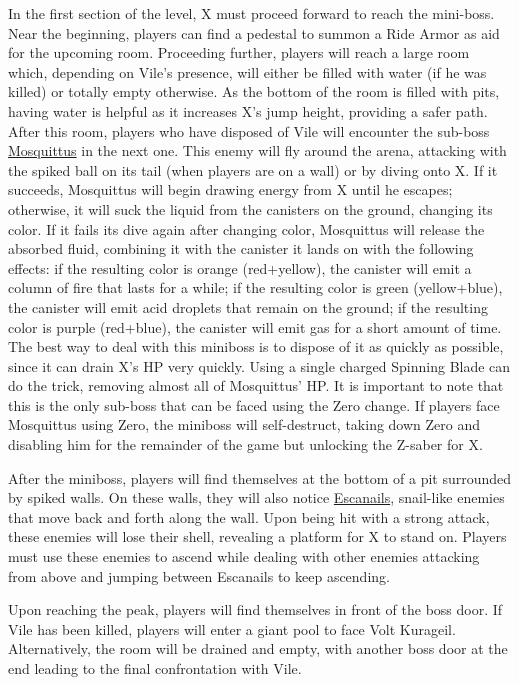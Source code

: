 In the first section of the level, X must proceed forward to reach the mini-boss. Near the beginning, players can find a pedestal to summon a Ride Armor as aid for the upcoming room. Proceeding further, players will reach a large room which, depending on Vile's presence, will either be filled with water (if he was killed) or totally empty otherwise. As the bottom of the room is filled with pits, having water is helpful as it increases X's jump height, providing a safer path. After this room, players who have disposed of Vile will encounter the sub-boss \hyperlink{miniboss:Mosquittus}{Mosquittus} in the next one. This enemy will fly around the arena, attacking with the spiked ball on its tail (when players are on a wall) or by diving onto X. If it succeeds, Mosquittus will begin drawing energy from X until he escapes; otherwise, it will suck the liquid from the canisters on the ground, changing its color. If it fails its dive again after changing color, Mosquittus will release the absorbed fluid, combining it with the canister it lands on with the following effects: if the resulting color is orange (red+yellow), the canister will emit a column of fire that lasts for a while; if the resulting color is green (yellow+blue), the canister will emit acid droplets that remain on the ground; if the resulting color is purple (red+blue), the canister will emit gas for a short amount of time. The best way to deal with this miniboss is to dispose of it as quickly as possible, since it can drain X's HP very quickly. Using a single charged Spinning Blade can do the trick, removing almost all of Mosquittus' HP. It is important to note that this is the only sub-boss that can be faced using the Zero change. If players face Mosquittus using Zero, the miniboss will self-destruct, taking down Zero and disabling him for the remainder of the game but unlocking the Z-saber for X.

After the miniboss, players will find themselves at the bottom of a pit surrounded by spiked walls. On these walls, they will also notice \hyperlink{enem:Escanail}{Escanails}, snail-like enemies that move back and forth along the wall. Upon being hit with a strong attack, these enemies will lose their shell, revealing a platform for X to stand on. Players must use these enemies to ascend while dealing with other enemies attacking from above and jumping between Escanails to keep ascending.

Upon reaching the peak, players will find themselves in front of the boss door. If Vile has been killed, players will enter a giant pool to face Volt Kurageil. Alternatively, the room will be drained and empty, with another boss door at the end leading to the final confrontation with Vile.

